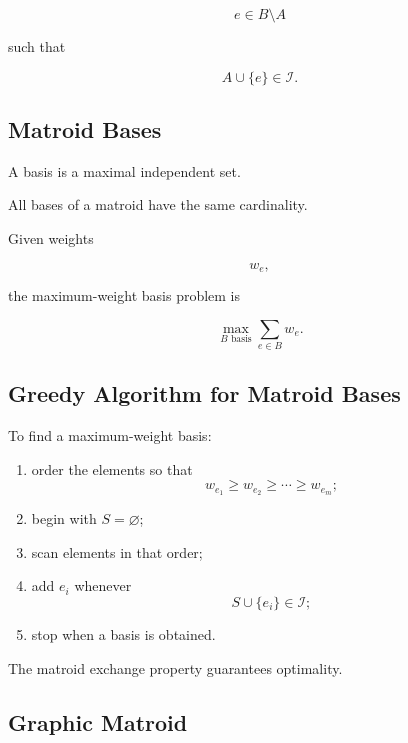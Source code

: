 \[
e\in B\setminus A
\]

such that

\[
\boxed{
A\cup\{e\}\in\mathcal{I}.
}
\]

\subsection{Matroid Bases}
\label{subsec:matroid-bases-optimization}

A basis is a maximal independent set.

All bases of a matroid have the same cardinality.

Given weights

\[
w_e,
\]

the maximum-weight basis problem is

\[
\boxed{
\max_{B\text{ basis}}
\sum_{e\in B}
w_e.
}
\]

\subsection{Greedy Algorithm for Matroid Bases}
\label{subsec:matroid-greedy-algorithm}

To find a maximum-weight basis:

\begin{enumerate}
    \item order the elements so that
    \[
    w_{e_1}\geq w_{e_2}\geq\cdots\geq w_{e_m};
    \]
    \item begin with \(S=\varnothing\);
    \item scan elements in that order;
    \item add \(e_i\) whenever
    \[
    S\cup\{e_i\}\in\mathcal{I};
    \]
    \item stop when a basis is obtained.
\end{enumerate}

The matroid exchange property guarantees optimality.

\subsection{Graphic Matroid}
\label{subsec:graphic-matroid-optimization}

